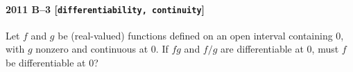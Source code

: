 \paragraph{2011 B--3 \textnormal{[\texttt{differentiability, continuity}]}}
Let $f$ and $g$ be (real-valued) functions defined on an open
interval containing $0$, with $g$ nonzero and continuous at $0$. If $fg$
and $f/g$ are differentiable at $0$, must $f$ be differentiable at 0?
